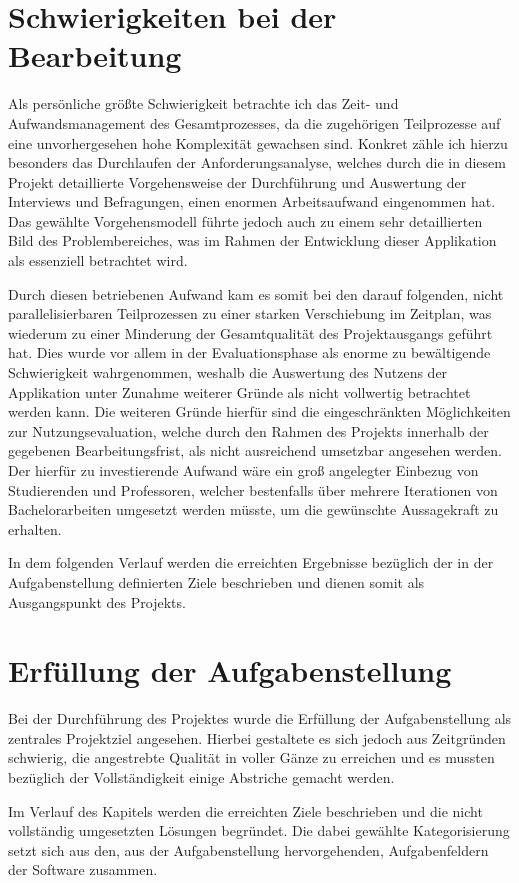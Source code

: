 \documentclass[bibliography=totoc,listof=totoc,BCOR=5mm,DIV=12,oneside]{scrbook}
\begin{document}
{\newpage
\section{Schwierigkeiten bei der Bearbeitung}
\par Als persönliche größte Schwierigkeit betrachte ich das Zeit- und Aufwandsmanagement des Gesamtprozesses, da die zugehörigen Teilprozesse auf eine unvorhergesehen hohe Komplexität gewachsen sind. Konkret zähle ich hierzu besonders das Durchlaufen der Anforderungsanalyse, welches durch die in diesem Projekt detaillierte Vorgehensweise der Durchführung und Auswertung der Interviews und Befragungen, einen enormen Arbeitsaufwand eingenommen hat. Das gewählte Vorgehensmodell führte jedoch auch zu einem sehr detaillierten Bild des Problembereiches, was im Rahmen der Entwicklung dieser Applikation als essenziell betrachtet wird. 

\par \bigskip Durch diesen betriebenen Aufwand kam es somit bei den darauf folgenden, nicht parallelisierbaren Teilprozessen zu einer starken Verschiebung im Zeitplan, was wiederum zu einer Minderung der Gesamtqualität des Projektausgangs geführt hat. Dies wurde vor allem in der Evaluationsphase als enorme zu bewältigende Schwierigkeit wahrgenommen, weshalb die Auswertung des Nutzens der Applikation unter Zunahme weiterer Gründe als nicht vollwertig betrachtet werden kann. Die weiteren Gründe hierfür sind die eingeschränkten Möglichkeiten zur Nutzungsevaluation, welche durch den Rahmen des Projekts innerhalb der gegebenen Bearbeitungsfrist, als nicht ausreichend umsetzbar angesehen werden. Der hierfür zu investierende Aufwand wäre ein groß angelegter Einbezug von Studierenden und Professoren, welcher bestenfalls über mehrere Iterationen von Bachelorarbeiten umgesetzt werden müsste, um die gewünschte Aussagekraft zu erhalten.

\par \bigskip In dem folgenden Verlauf werden die erreichten Ergebnisse bezüglich der in der Aufgabenstellung definierten Ziele beschrieben und dienen somit als Ausgangspunkt des Projekts.

\section{Erfüllung der Aufgabenstellung}
\par Bei der Durchführung des Projektes wurde die Erfüllung der Aufgabenstellung als zentrales Projektziel angesehen. Hierbei gestaltete es sich jedoch aus Zeitgründen schwierig, die angestrebte Qualität in voller Gänze zu erreichen und es mussten bezüglich der Vollständigkeit einige Abstriche gemacht werden.
\par \bigskip Im Verlauf des Kapitels werden die erreichten Ziele beschrieben und die nicht vollständig umgesetzten Lösungen begründet. Die dabei gewählte Kategorisierung setzt sich aus den, aus der Aufgabenstellung hervorgehenden, Aufgabenfeldern der Software zusammen.

}
\end{document}
